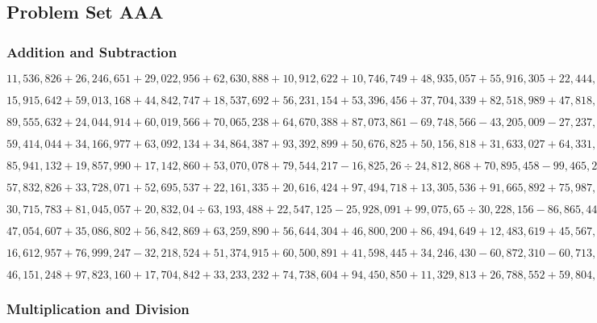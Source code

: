 \hypertarget{problem-set-aaa-5}{%
\subsection{Problem Set AAA}\label{problem-set-aaa-5}}

\hypertarget{addition-and-subtraction-361}{%
\subsubsection{Addition and
Subtraction}\label{addition-and-subtraction-361}}

\(11,536,826+26,246,651+29,022,956+62,630,888+10,912,622+10,746,749+48,935,057+55,916,305+22,444,247+39,535,888\)

\(15,915,642+59,013,168+44,842,747+18,537,692+56,231,154+53,396,456+37,704,339+82,518,989+47,818,070+97,034,904\)

\(89,555,632+24,044,914+60,019,566+70,065,238+64,670,388+87,073,861-69,748,566-43,205,009-27,237,780-95,522,428\)

\(59,414,044+34,166,977+63,092,134+34,864,387+93,392,899+50,676,825+50,156,818+31,633,027+64,331,714+35,158,074\)

\(85,941,132+19,857,990+17,142,860+53,070,078+79,544,217-16,825,26÷24,812,868+70,895,458-99,465,247-87,411,429\)

\(57,832,826+33,728,071+52,695,537+22,161,335+20,616,424+97,494,718+13,305,536+91,665,892+75,987,977+29,657,498\)

\(30,715,783+81,045,057+20,832,04÷63,193,488+22,547,125-25,928,091+99,075,65÷30,228,156-86,865,447+92,632,002\)

\(47,054,607+35,086,802+56,842,869+63,259,890+56,644,304+46,800,200+86,494,649+12,483,619+45,567,035+35,893,707\)

\(16,612,957+76,999,247-32,218,524+51,374,915+60,500,891+41,598,445+34,246,430-60,872,310-60,713,970-82,896,075\)

\(46,151,248+97,823,160+17,704,842+33,233,232+74,738,604+94,450,850+11,329,813+26,788,552+59,804,158+98,230,689\)

\hypertarget{multiplication-and-division-360}{%
\subsubsection{Multiplication and
Division}\label{multiplication-and-division-360}}

